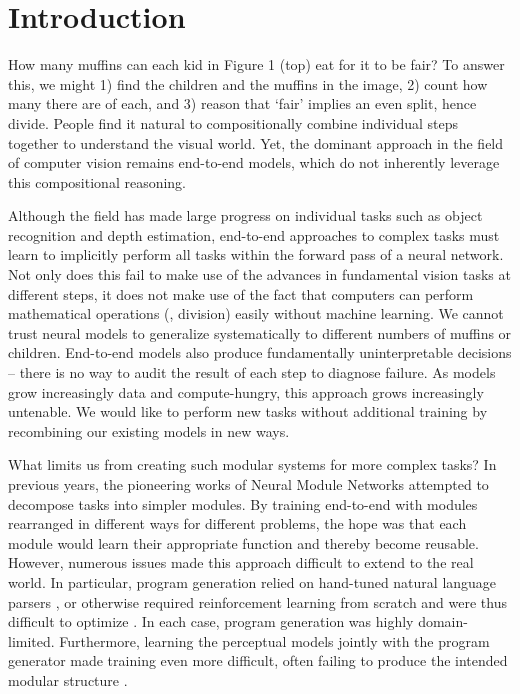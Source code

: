 \documentclass[10pt,twocolumn,letterpaper]{article}
\begin{document}
\section{Introduction}

How many muffins can each kid in Figure 1 (top) eat for it to be fair? To answer this, we might 1) find the children and the muffins in the image, 2) count how many there are of each, and 3) reason that `fair' implies an even split, hence divide. People find it natural to compositionally combine individual steps together to understand the visual world. Yet, the dominant approach in the field of computer vision remains end-to-end models, which do not inherently leverage this compositional reasoning. 

Although the field has made large progress on individual tasks such as object recognition and depth estimation, end-to-end approaches to complex tasks must learn to implicitly perform all tasks within the forward pass of a neural network.
Not only does this fail to make use of the advances in fundamental vision tasks at different steps, it does not make use of the fact that computers can perform mathematical operations (\eg, division) easily without machine learning. We cannot trust neural models to generalize systematically to different numbers of muffins or children. End-to-end models also produce fundamentally uninterpretable decisions -- there is no way to audit the result of each step to diagnose failure. As models grow increasingly data and compute-hungry, this approach grows increasingly untenable. We would like to perform new tasks without additional training by recombining our existing models in new ways.

What limits us from creating such modular systems for more complex tasks?
In previous years, the pioneering works of Neural Module Networks \cite{Andreas_2016_CVPR,johnson_inferring_2017,hu_learning_2017}
attempted to decompose tasks into simpler modules. By training end-to-end with modules rearranged in different ways for different problems, the hope was that each module would learn their appropriate function and thereby become reusable. However, numerous issues made this approach difficult to extend to the real world. In particular, program generation relied on hand-tuned natural language parsers \cite{Andreas_2016_CVPR}, or otherwise required reinforcement learning from scratch and were thus difficult to optimize \cite{hu_learning_2017,johnson_inferring_2017}. In each case, program generation was highly domain-limited. Furthermore, learning the perceptual models jointly with the program generator made training even more difficult, often failing to produce the intended modular structure \cite{bahdanau_systematic_2019,subramanian_obtaining_2020}.
\end{document}

